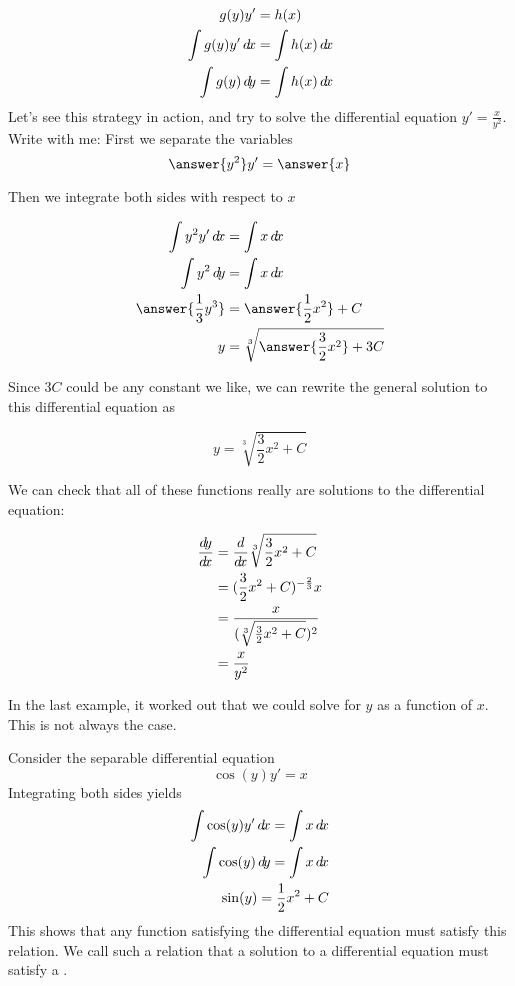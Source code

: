 \documentclass{ximera}
\begin{document}
\begin{example}
  
  \begin{align*}
    g(y)y'  &= h(x)\\
    \int g(y) y' \d x &= \int h(x) \d x\\
    \int g(y) \d y &= \int h(x) \d x
  \end{align*}
  Let's see this strategy in action, and try to solve the differential equation $y' = \frac{x}{y^2}$.
  Write with me:
  First we separate the variables
  \[
  \answer{y^2} y' = \answer{x}
  \]
  
  Then we integrate both sides with respect to $x$
  
  \begin{align*}
    \int y^2 y' \d x &= \int x \d x\\
    \int y^2 \d y &= \int x \d x\\
    \answer{\frac{1}{3} y^3} &= \answer{\frac{1}{2}x^2}+C\\
    y &= \sqrt[3]{\answer{\frac{3}{2}x^2}+3C}
  \end{align*}
  
  Since $3C$ could be any constant we like, we can rewrite the general solution to this differential equation as 
  
  \[
  y = \sqrt[3]{\frac{3}{2}x^2+C}
  \]
  
  We can check that all of these functions really are solutions to the differential equation:
  
  \begin{align*}
    \frac{\mathop{}\!d\! y}{\mathop{}\!d\! x} &= \frac{d}{\mathop{}\!d\! x} \sqrt[3]{\frac{3}{2}x^2+C}\\
    &=(\frac{3}{2}x^2+C)^{-\frac{2}{3}} x\\
    &= \frac{x}{(\sqrt[3]{\frac{3}{2}x^2+C})^2}\\
    &= \frac{x}{y^2}
  \end{align*}
\end{example}


In the last example, it worked out that we could solve for $y$ as a function of $x$.  This is not always the case.

\begin{example}
  Consider the separable differential equation
  \[
  \cos(y) y' = x
  \]
  Integrating both sides yields
  \begin{align*}
    \int \cos(y) y' \d x = \int x \d x\\
    \int \cos(y) \d y = \int x \d x\\
    \sin(y) = \frac{1}{2}x^2+C
  \end{align*}
  This shows that any function satisfying the differential equation
  must satisfy this relation.  We call such a relation that a solution
  to a differential equation must satisfy a .	
\end{example}
\end{document}
